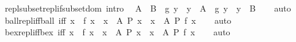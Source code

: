 \begin{isabellebody}
\ repl{\isacharunderscore}{\kern0pt}subset{\isacharunderscore}{\kern0pt}repl{\isacharunderscore}{\kern0pt}if{\isacharunderscore}{\kern0pt}subset{\isacharunderscore}{\kern0pt}dom\ {\isacharbrackleft}{\kern0pt}intro{\isacharbang}{\kern0pt}{\isacharbrackright}{\kern0pt}{\isacharcolon}{\kern0pt}\isanewline
\ \ {\isachardoublequoteopen}A\ {\isasymsubseteq}\ B\ {\isasymLongrightarrow}\ {\isacharbraceleft}{\kern0pt}g\ y\ {\isacharbar}{\kern0pt}\ y\ {\isasymin}\ A{\isacharbraceright}{\kern0pt}\ {\isasymsubseteq}\ {\isacharbraceleft}{\kern0pt}g\ y\ {\isacharbar}{\kern0pt}\ y\ {\isasymin}\ B{\isacharbraceright}{\kern0pt}{\isachardoublequoteclose}\isanewline
%
\isadelimproof
\ \ %
\endisadelimproof
%
\isatagproof
{}\isamarkupfalse%
\ auto%
\endisatagproof
{\isafoldproof}%
%
\isadelimproof
\isanewline
%
\endisadelimproof
\isanewline
{}\isamarkupfalse%
\ ball{\isacharunderscore}{\kern0pt}repl{\isacharunderscore}{\kern0pt}iff{\isacharunderscore}{\kern0pt}ball\ {\isacharbrackleft}{\kern0pt}iff{\isacharbrackright}{\kern0pt}{\isacharcolon}{\kern0pt}\ {\isachardoublequoteopen}{\isacharparenleft}{\kern0pt}{\isasymforall}x\ {\isasymin}\ {\isacharbraceleft}{\kern0pt}f\ x\ {\isacharbar}{\kern0pt}\ x\ {\isasymin}\ A{\isacharbraceright}{\kern0pt}{\isachardot}{\kern0pt}\ P\ x{\isacharparenright}{\kern0pt}\ {\isasymlongleftrightarrow}\ {\isacharparenleft}{\kern0pt}{\isasymforall}x\ {\isasymin}\ A{\isachardot}{\kern0pt}\ P\ {\isacharparenleft}{\kern0pt}f\ x{\isacharparenright}{\kern0pt}{\isacharparenright}{\kern0pt}{\isachardoublequoteclose}\isanewline
%
\isadelimproof
\ \ %
\endisadelimproof
%
\isatagproof
{}\isamarkupfalse%
\ auto%
\endisatagproof
{\isafoldproof}%
%
\isadelimproof
\isanewline
%
\endisadelimproof
\isanewline
{}\isamarkupfalse%
\ bex{\isacharunderscore}{\kern0pt}repl{\isacharunderscore}{\kern0pt}iff{\isacharunderscore}{\kern0pt}bex\ {\isacharbrackleft}{\kern0pt}iff{\isacharbrackright}{\kern0pt}{\isacharcolon}{\kern0pt}\ {\isachardoublequoteopen}{\isacharparenleft}{\kern0pt}{\isasymexists}x\ {\isasymin}\ {\isacharbraceleft}{\kern0pt}f\ x\ {\isacharbar}{\kern0pt}\ x\ {\isasymin}\ A{\isacharbraceright}{\kern0pt}{\isachardot}{\kern0pt}\ P\ x{\isacharparenright}{\kern0pt}\ {\isasymlongleftrightarrow}\ {\isacharparenleft}{\kern0pt}{\isasymexists}x\ {\isasymin}\ A{\isachardot}{\kern0pt}\ P\ {\isacharparenleft}{\kern0pt}f\ x{\isacharparenright}{\kern0pt}{\isacharparenright}{\kern0pt}{\isachardoublequoteclose}\isanewline
%
\isadelimproof
\ \ %
\endisadelimproof
%
\isatagproof
{}\isamarkupfalse%
\ auto%

\end{isabellebody}
